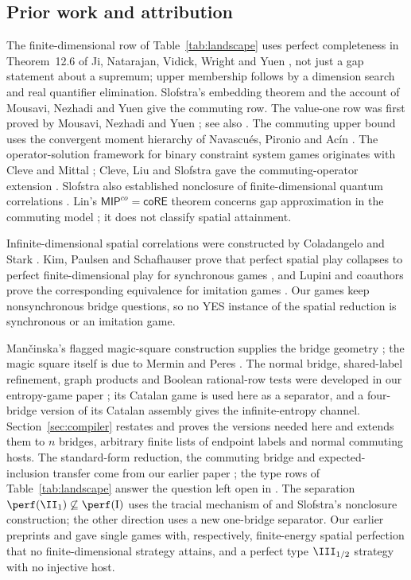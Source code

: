 \subsection{Prior work and attribution}
The finite-dimensional row of Table~\ref{tab:landscape} uses perfect completeness in Theorem~12.6 of Ji, Natarajan, Vidick, Wright and Yuen \cite{MIPRE}, not just a gap statement about a supremum; upper membership follows by a dimension search and real quantifier elimination. Slofstra's embedding theorem \cite{Slofstra} and the account of Mousavi, Nezhadi and Yuen \cite[Theorem~6.4]{MNY} give the commuting row. The value-one row was first proved by Mousavi, Nezhadi and Yuen \cite{MNY20}; see also \cite[Theorem~6.9]{MNY}. The commuting upper bound uses the convergent moment hierarchy of Navascu\'es, Pironio and Ac\'in \cite{NPA}. The operator-solution framework for binary constraint system games originates with Cleve and Mittal \cite{CM}; Cleve, Liu and Slofstra gave the commuting-operator extension \cite{CLS}. Slofstra also established nonclosure of finite-dimensional quantum correlations \cite{SlofstraNonclosed}. Lin's $\mathsf{MIP}^{co}=\mathsf{coRE}$ theorem concerns gap approximation in the commuting model \cite{Lin}; it does not classify spatial attainment.

Infinite-dimensional spatial correlations were constructed by Coladangelo and Stark \cite{CS}. Kim, Paulsen and Schafhauser prove that perfect spatial play collapses to perfect finite-dimensional play for synchronous games \cite[Corollary 3.11]{KPS}, and Lupini and coauthors prove the corresponding equivalence for imitation games \cite[Corollary~5.4]{Imitation}. Our games keep nonsynchronous bridge questions, so no YES instance of the spatial reduction is synchronous or an imitation game.

Man\v{c}inska's flagged magic-square construction supplies the bridge geometry \cite{Mancinska}; the magic square itself is due to Mermin and Peres \cite{Mermin,Peres}. The normal bridge, shared-label refinement, graph products and Boolean rational-row tests were developed in our entropy-game paper \cite[Lemmas~4.1 and 4.2, Theorem~B, Eq.~(32)]{Entropy}; its Catalan game \cite[Theorem~C]{Entropy} is used here as a separator, and a four-bridge version of its Catalan assembly gives the infinite-entropy channel. Section~\ref{sec:compiler} restates and proves the versions needed here and extends them to $n$ bridges, arbitrary finite lists of endpoint labels and normal commuting hosts. The standard-form reduction, the commuting bridge and expected-inclusion transfer come from our earlier paper \cite[Lemmas~1.6, 2.2 and 3.1]{ReadType}; the type rows of Table~\ref{tab:landscape} answer the question left open in \cite[Theorem~7.6]{ReadType}. The separation $\perf(\II_1)\not\subseteq\perf(\mathrm I)$ uses the tracial mechanism of \cite[Proposition~7.4]{ReadType} and Slofstra's nonclosure construction; the other direction uses a new one-bridge separator. Our earlier preprints \cite{Gamma} and \cite{Hyperfinite} gave single games with, respectively, finite-energy spatial perfection that no finite-dimensional strategy attains, and a perfect type $\III_{1/2}$ strategy with no injective host.

